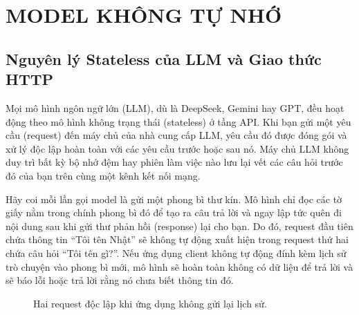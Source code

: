 \chapter{MODEL KHÔNG TỰ NHỚ}
\label{chap:model-no-memory}

\section{Nguyên lý Stateless của LLM và Giao thức HTTP}

Mọi mô hình ngôn ngữ lớn (LLM), dù là DeepSeek, Gemini hay GPT, đều hoạt động theo mô hình không trạng thái (stateless) ở tầng API. Khi bạn gửi một yêu cầu (request) đến máy chủ của nhà cung cấp LLM, yêu cầu đó được đóng gói và xử lý độc lập hoàn toàn với các yêu cầu trước hoặc sau nó. Máy chủ LLM không duy trì bất kỳ bộ nhớ đệm hay phiên làm việc nào lưu lại vết các câu hỏi trước đó của bạn trên cùng một kênh kết nối mạng.

Hãy coi mỗi lần gọi model là gửi một phong bì thư kín. Mô hình chỉ đọc các tờ giấy nằm trong chính phong bì đó để tạo ra câu trả lời và ngay lập tức quên đi nội dung sau khi gửi thư phản hồi (response) lại cho bạn. Do đó, request đầu tiên chứa thông tin ``Tôi tên Nhật'' sẽ không tự động xuất hiện trong request thứ hai chứa câu hỏi ``Tôi tên gì?''. Nếu ứng dụng client không tự động đính kèm lịch sử trò chuyện vào phong bì mới, mô hình sẽ hoàn toàn không có dữ liệu để trả lời và sẽ báo lỗi hoặc trả lời rằng nó chưa biết thông tin đó.

\begin{figure}[H]
\centering
{}
\caption{Hai request độc lập khi ứng dụng không gửi lại lịch sử.}
\label{fig:stateless-requests}
\end{figure}


